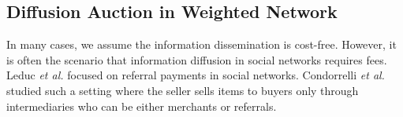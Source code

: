 \documentclass{article}
\begin{document}
\subsection{Diffusion Auction in Weighted Network}
In many cases, we assume the information dissemination is cost-free. However, it is often the scenario that information diffusion in social networks requires fees. Leduc \emph{et al.}  focused on referral payments in social networks. Condorrelli \emph{et al.}  studied such a setting where the seller sells items to buyers only through intermediaries who can be either merchants or referrals.
\end{document}
